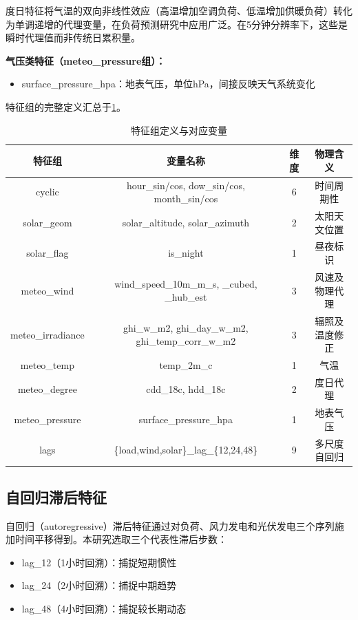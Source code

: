 度日特征将气温的双向非线性效应（高温增加空调负荷、低温增加供暖负荷）转化为单调递增的代理变量，在负荷预测研究中应用广泛\cite{panczyk2024kan}。在5分钟分辨率下，这些是瞬时代理值而非传统日累积量。

\textbf{气压类特征（meteo\_pressure组）：}
\begin{itemize}
  \item surface\_pressure\_hpa：地表气压，单位hPa，间接反映天气系统变化
\end{itemize}

特征组的完整定义汇总于\cref{tab:feature-groups}。

\begin{table}[htbp]
\centering
\caption{特征组定义与对应变量}
\label{tab:feature-groups}
\begin{tabular}{cccc}
\toprule
特征组 & 变量名称 & 维度 & 物理含义 \\
\midrule
cyclic & hour\_sin/cos, dow\_sin/cos, month\_sin/cos & 6 & 时间周期性 \\
solar\_geom & solar\_altitude, solar\_azimuth & 2 & 太阳天文位置 \\
solar\_flag & is\_night & 1 & 昼夜标识 \\
meteo\_wind & wind\_speed\_10m\_m\_s, \_cubed, \_hub\_est & 3 & 风速及物理代理 \\
meteo\_irradiance & ghi\_w\_m2, ghi\_day\_w\_m2, ghi\_temp\_corr\_w\_m2 & 3 & 辐照及温度修正 \\
meteo\_temp & temp\_2m\_c & 1 & 气温 \\
meteo\_degree & cdd\_18c, hdd\_18c & 2 & 度日代理 \\
meteo\_pressure & surface\_pressure\_hpa & 1 & 地表气压 \\
lags & \{load,wind,solar\}\_lag\_\{12,24,48\} & 9 & 多尺度自回归 \\
\bottomrule
\end{tabular}
\end{table}

\subsection{自回归滞后特征}

自回归（autoregressive）滞后特征通过对负荷、风力发电和光伏发电三个序列施加时间平移得到。本研究选取三个代表性滞后步数：

\begin{itemize}
  \item lag\_12（1小时回溯）：捕捉短期惯性
  \item lag\_24（2小时回溯）：捕捉中期趋势
  \item lag\_48（4小时回溯）：捕捉较长期动态
\end{itemize}

